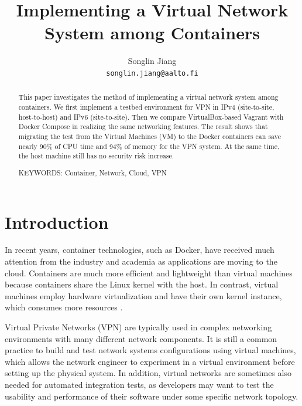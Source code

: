 \documentclass[article]{aaltoseries}
\begin{document}
 

\title{Implementing a Virtual Network System among Containers}

\author{Songlin Jiang%
\\\textnormal{\texttt{songlin.jiang@aalto.fi}}} %


\maketitle


\begin{abstract}
This paper investigates the method of implementing a virtual network system among containers. We first implement a testbed environment for VPN in IPv4 (site-to-site, host-to-host) and IPv6 (site-to-site). Then we compare VirtualBox-based Vagrant with Docker Compose in realizing the same networking features. The result shows that migrating the test from the Virtual Machines (VM) to the Docker containers can save nearly 90\% of CPU time and 94\% of memory for the VPN system. At the same time, the host machine still has no security risk increase.

\vspace{3mm}
\noindent KEYWORDS: Container, Network, Cloud, VPN

\end{abstract}




\section{Introduction}

In recent years, container technologies, such as Docker, have received much attention from the industry and academia as applications are moving to the cloud. Containers are much more efficient and lightweight than virtual machines because containers share the Linux kernel with the host. In contrast, virtual machines employ hardware virtualization and have their own kernel instance, which consumes more resources \cite{10.1145/2988336.2988337}.

Virtual Private Networks (VPN) are typically used in complex networking environments with many different network components. It is still a common practice \cite{9151942} to build and test network systems configurations using virtual machines, which allows the network engineer to experiment in a virtual environment before setting up the physical system. In addition, virtual networks are sometimes also needed for automated integration tests, as developers may want to test the usability and performance of their software under some specific network topology.
\end{document}
